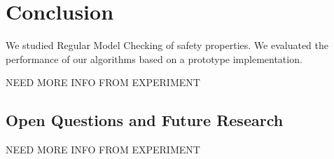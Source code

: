 \chapter{Conclusion}\label{chapter:conclusion}
We studied Regular Model Checking of safety properties. We evaluated the performance 
of our algorithms based on a prototype implementation. 

NEED MORE INFO FROM EXPERIMENT
\section*{Open Questions and Future Research}
NEED MORE INFO FROM EXPERIMENT